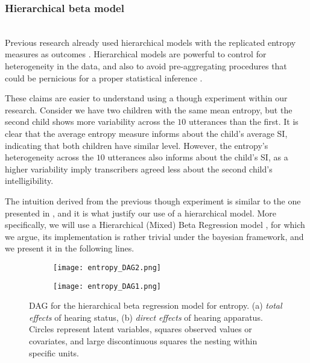 \subsubsection{Hierarchical beta model} \\
%
Previous research already used hierarchical models with the replicated entropy measures as outcomes \citep{Boonen_et_al_2021, Faes_et_al_2021}. Hierarchical models are powerful to control for heterogeneity in the data, and also to avoid pre-aggregating procedures that could be pernicious for a proper statistical inference \citep{McElreath_2020}. 

These claims are easier to understand using a though experiment within our research. Consider we have two children with the same mean entropy, but the second child shows more variability across the $10$ utterances than the first. It is clear that the average entropy measure informs about the child's average SI, indicating that both children have similar level. However, the entropy's heterogeneity across the $10$ utterances also informs about the child's SI, as a higher variability imply transcribers agreed less about the second child's intelligibility.

The intuition derived from the previous though experiment is similar to the one presented in \citet{Boonen_et_al_2021}, and it is what justify our use of a hierarchical model. More specifically, we will use a Hierarchical (Mixed) Beta Regression model \citep{Figueroa-Zuniga_et_al_2013}, for which we argue, its implementation is rather trivial under the bayesian framework, and we present it in the following lines.
%
\begin{figure}[h]
	\centering
	\begin{subfigure}{0.35\textwidth}
		\centering
		\texttt{[image: entropy\_DAG2.png]}
		\caption{}
	\end{subfigure}
	\hspace{0.1\textwidth}
	\begin{subfigure}{0.425\textwidth}
		\centering
		\texttt{[image: entropy\_DAG1.png]}
		\caption{}
	\end{subfigure}
	\caption[DAG for the hierarchical beta regression model for entropy.]%
	{DAG for the hierarchical beta regression model for entropy. (a) \textit{total effects} of hearing status, (b) \textit{direct effects} of hearing apparatus. Circles represent latent variables, squares observed values or covariates, and large discontinuous squares the nesting within specific units.}
	\label{fig:entropy_ME}
\end{figure}
%

